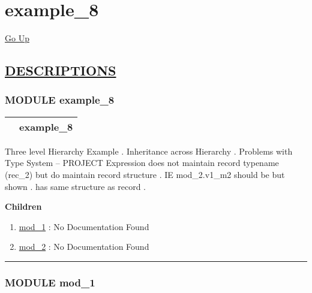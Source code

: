 \chapter*{\color{headfile}
example_8
}
\hypertarget{ecldoc:toc:example_8}{}
\hyperlink{ecldoc:toc:root}{Go Up}


\section*{\underline{\textsf{DESCRIPTIONS}}}
\subsection*{\textsf{\colorbox{headtoc}{\color{white} MODULE}
example\_8}}

\hypertarget{ecldoc:example_8}{}

{\renewcommand{\arraystretch}{1.5}
\begin{tabularx}{\textwidth}{|>{\raggedright\arraybackslash}l|X|}
\hline
\hspace{0pt}\mytexttt{\color{red} } & \textbf{example\_8} \\
\hline
\end{tabularx}
}

\par





Three level Hierarchy Example . Inheritance across Hierarchy . Problems with Type System -- PROJECT Expression does not maintain record typename (rec\_2) but do maintain record structure . IE mod\_2.v1\_m2 should be  but shown  .  has same structure as record  .







\textbf{Children}
\begin{enumerate}
\item \hyperlink{ecldoc:example_8.mod_1}{mod\_1}
: No Documentation Found
\item \hyperlink{ecldoc:example_8.mod_2}{mod\_2}
: No Documentation Found
\end{enumerate}

\rule{\linewidth}{0.5pt}

\subsection*{\textsf{\colorbox{headtoc}{\color{white} MODULE}
mod\_1}}

